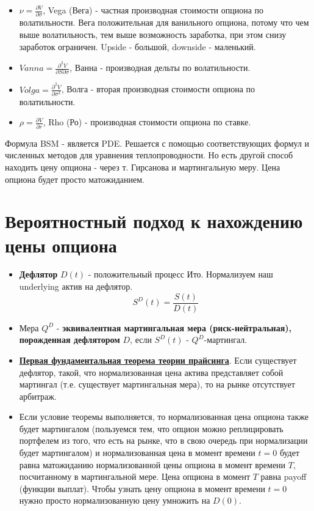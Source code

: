 \documentclass{article}
\begin{document}
\begin{itemize}

    \item \(\nu = \frac{\partial V}{\partial \sigma}\), Vega (Вега) - частная производная стоимости опциона по волатильности. Вега положительная для ванильного опциона, потому что чем выше волатильность, тем выше возможность заработка, при этом снизу заработок ограничен. Upside - большой, downside - маленький. 
    
    \item \(Vanna = \frac{\partial^2 V}{\partial S \partial \sigma}\), Ванна - производная дельты по волатильности. 
    
    \item \(Volga = \frac{\partial^2 V}{\partial \sigma^2}\), Волга - вторая производная стоимости опциона по волатильности. 
    
     \item \(\rho = \frac{\partial V}{\partial r}\), Rho (Ро) - производная стоимости опциона по ставке. 
\end{itemize}


Формула BSM - является PDE. Решается с помощью соответствующих формул и численных методов для уравнения теплопроводности. Но есть другой способ находить цену опциона - через т. Гирсанова и мартингальную меру. Цена опциона будет просто матожиданием. 


\section{Вероятностный подход к нахождению цены опциона}

\begin{itemize}
    \item \textbf{Дефлятор} \(D(t)\) - положительный процесс Ито. Нормализуем наш underlying актив на дефлятор.
\[S^D (t) = \frac{S(t)}{D(t)}\]

    \item Мера \(Q^D\) - \textbf{эквивалентная мартингальная мера (риск-нейтральная), порожденная дефлятором} \(D\), если \(S^D (t)\) - \(Q^D\)-мартингал. 

    \item \underline{\textbf{Первая фундаментальная теорема теории прайсинга}}. Если существует дефлятор, такой, что нормализованная цена актива представляет собой мартингал (т.е. существует мартингальная мера), то на рынке отсутствует арбитраж. 

    \item Если условие теоремы выполняется, то нормализованная цена опциона также будет мартингалом (пользуемся тем, что опцион можно реплицировать портфелем из того, что есть на рынке, что в свою очередь при нормализации будет мартингалом) и нормализованная цена в момент времени \(t=0\) будет равна матожиданию нормализованной цены опциона в момент времени \(T\), посчитанному в мартингальной мере. Цена опциона в момент \(T\) равна payoff (функции выплат). Чтобы узнать цену опциона в момент времени \(t=0\) нужно просто нормализованную цену умножить на \(D(0)\).
\end{itemize}
\end{document}
